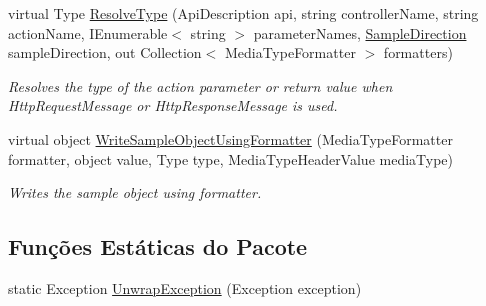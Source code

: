 \begin{DoxyCompactItemize}
virtual Type \hyperlink{classApi3Layers_1_1Areas_1_1HelpPage_1_1HelpPageSampleGenerator_a71304267702433f40e3c258cf76ca002}{Resolve\+Type} (Api\+Description api, string controller\+Name, string action\+Name, I\+Enumerable$<$ string $>$ parameter\+Names, \hyperlink{namespaceApi3Layers_1_1Areas_1_1HelpPage_abad9f6d2b059d72558bf70415efc32b5}{Sample\+Direction} sample\+Direction, out Collection$<$ Media\+Type\+Formatter $>$ formatters)
\begin{DoxyCompactList}\small\item\em Resolves the type of the action parameter or return value when Http\+Request\+Message or Http\+Response\+Message is used. \end{DoxyCompactList}\item 
virtual object \hyperlink{classApi3Layers_1_1Areas_1_1HelpPage_1_1HelpPageSampleGenerator_a41bda7fb25234296d2c04e3370a50589}{Write\+Sample\+Object\+Using\+Formatter} (Media\+Type\+Formatter formatter, object value, Type type, Media\+Type\+Header\+Value media\+Type)
\begin{DoxyCompactList}\small\item\em Writes the sample object using formatter. \end{DoxyCompactList}\end{DoxyCompactItemize}
\subsection*{Funções Estáticas do Pacote}
\begin{DoxyCompactItemize}
\item 
static Exception \hyperlink{classApi3Layers_1_1Areas_1_1HelpPage_1_1HelpPageSampleGenerator_ad7db82db5d8ace309e1e3db10283942e}{Unwrap\+Exception} (Exception exception)
\end{DoxyCompactItemize}
